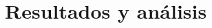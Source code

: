 \documentclass[main.tex]{subfiles}
\begin{document}
	\onlyinsubfile{

		
		\tableofcontents
		\listoftodos[Notes]
	}

\chapter{Resultados y análisis}
\lipsum[1-8]


\onlyinsubfile{
	
	
}
\end{document}

